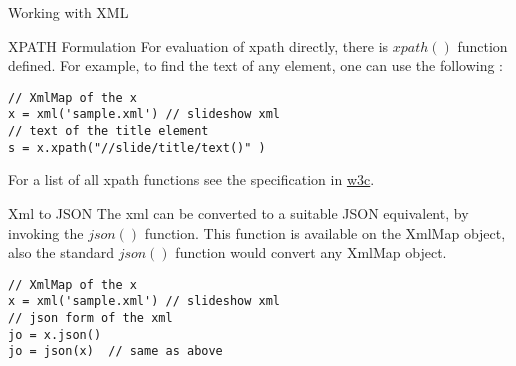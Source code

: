 \begin{section}{Working with XML}
\begin{subsection}{XPATH Formulation}
For evaluation of xpath directly, there is $xpath()$ function 
defined. For example, to find the text of any element, 
one can use the following :

\begin{lstlisting}[style=JexlStyle]
// XmlMap of the x 
x = xml('sample.xml') // slideshow xml
// text of the title element 
s = x.xpath("//slide/title/text()" )  
\end{lstlisting}

For a list of all xpath functions see the specification in 
\href{https://www.w3.org/TR/xpath-functions-3}{w3c}.

\end{subsection}

\begin{subsection}{Xml to JSON}
The xml can be converted to a suitable JSON equivalent, by invoking the $json()$ function.
This function is available on the XmlMap object, also the standard $json()$ function 
would convert any XmlMap object.

\begin{center}\begin{minipage}{\linewidth}
\begin{lstlisting}[style=JexlStyle]
// XmlMap of the x 
x = xml('sample.xml') // slideshow xml
// json form of the xml 
jo = x.json() 
jo = json(x)  // same as above
\end{lstlisting}
\end{minipage}\end{center}
 
\end{subsection}

\end{section}

